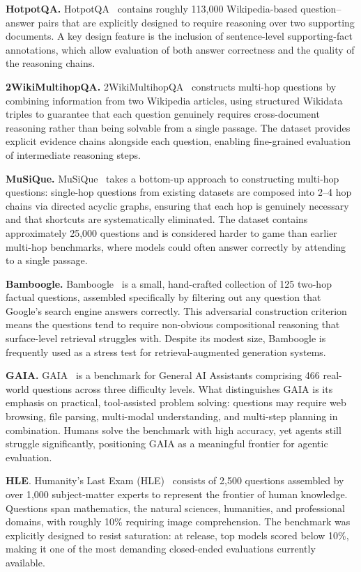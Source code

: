 \documentclass{llmxive}
\begin{document}
\noindent\textbf{HotpotQA.} HotpotQA~\cite{yang2018hotpotqa} contains roughly 113,000 Wikipedia-based question–answer pairs that are explicitly designed to require reasoning over two supporting documents. A key design feature is the inclusion of sentence-level supporting-fact annotations, which allow evaluation of both answer correctness and the quality of the reasoning chains.

\noindent\textbf{2WikiMultihopQA.} 2WikiMultihopQA~\cite{ho2020constructing} constructs multi-hop questions by combining information from two Wikipedia articles, using structured Wikidata triples to guarantee that each question genuinely requires cross-document reasoning rather than being solvable from a single passage. The dataset provides explicit evidence chains alongside each question, enabling fine-grained evaluation of intermediate reasoning steps. 
 
\noindent\textbf{MuSiQue.} MuSiQue~\cite{trivedi2022musique} takes a bottom-up approach to constructing multi-hop questions: single-hop questions from existing datasets are composed into 2–4 hop chains via directed acyclic graphs, ensuring that each hop is genuinely necessary and that shortcuts are systematically eliminated. The dataset contains approximately 25,000 questions and is considered harder to game than earlier multi-hop benchmarks, where models could often answer correctly by attending to a single passage.

\noindent\textbf{Bamboogle.} Bamboogle~\cite{press2023measuring} is a small, hand-crafted collection of 125 two-hop factual questions, assembled specifically by filtering out any question that Google's search engine answers correctly. This adversarial construction criterion means the questions tend to require non-obvious compositional reasoning that surface-level retrieval struggles with. Despite its modest size, Bamboogle is frequently used as a stress test for retrieval-augmented generation systems.

\noindent\textbf{GAIA.} GAIA~\cite{mialon2023gaia} is a benchmark for General AI Assistants comprising 466 real-world questions across three difficulty levels. What distinguishes GAIA is its emphasis on practical, tool-assisted problem solving: questions may require web browsing, file parsing, multi-modal understanding, and multi-step planning in combination. Humans solve the benchmark with high accuracy, yet agents still struggle significantly, positioning GAIA as a meaningful frontier for agentic evaluation.

\noindent\textbf{HLE}. Humanity's Last Exam (HLE)~\cite{phan2025humanity} consists of 2,500 questions assembled by over 1,000 subject-matter experts to represent the frontier of human knowledge. Questions span mathematics, the natural sciences, humanities, and professional domains, with roughly 10\% requiring image comprehension. The benchmark was explicitly designed to resist saturation: at release, top models scored below 10\%, making it one of the most demanding closed-ended evaluations currently available.
\end{document}
